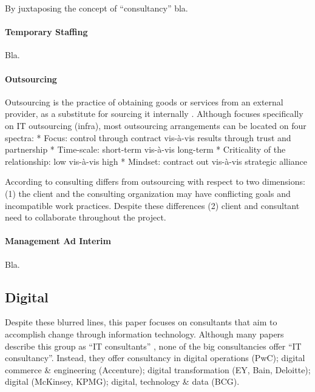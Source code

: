 \documentclass[12pt]{article}
\begin{document}
By juxtaposing the concept of ``consultancy'' bla.

\hypertarget{temporary-staffing}{%
\paragraph{Temporary Staffing}\label{temporary-staffing}}

Bla.

\hypertarget{outsourcing}{%
\paragraph{Outsourcing}\label{outsourcing}}

Outsourcing is the practice of obtaining goods or services from an
external provider, as a substitute for sourcing it internally \citep[
2]{lacity2012}. Although \citet[68-69]{willcocks1995} focuses
specifically on IT outsourcing (infra), most outsourcing arrangements
can be located on four spectra: * Focus: control through contract
vis-à-vis results through trust and partnership * Time-scale: short-term
vis-à-vis long-term * Criticality of the relationship: low vis-à-vis
high * Mindset: contract out vis-à-vis strategic alliance

According to \citet[255]{liberatore2010} consulting differs from
outsourcing with respect to two dimensions: (1) the client and the
consulting organization may have conflicting goals and incompatible work
practices. Despite these differences (2) client and consultant need to
collaborate throughout the project.

\hypertarget{management-ad-interim}{%
\paragraph{Management Ad Interim}\label{management-ad-interim}}

Bla.

\hypertarget{digital}{%
\subsection{Digital}\label{digital}}

Despite these blurred lines, this paper focuses on consultants that aim
to accomplish change through information technology. Although many
papers describe this group as ``IT consultants''
\citep{nevo2007, loh1992, fincham2006, armbruster2006, bloomfield1995, schwarz2005},
none of the big consultancies offer ``IT consultancy''. Instead, they
offer consultancy in digital operations (PwC); digital commerce \&
engineering (Accenture); digital transformation (EY, Bain, Deloitte);
digital (McKinsey, KPMG); digital, technology \& data (BCG).
\end{document}
